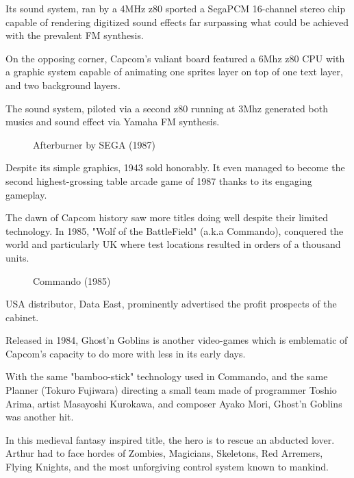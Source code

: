 Its sound system, ran by a 4MHz z80 sported a SegaPCM 16-channel stereo chip capable of rendering digitized sound effects far surpassing what could be achieved with the prevalent FM synthesis.

On the opposing corner, Capcom's valiant board featured a 6Mhz z80 CPU with a graphic system capable of animating one sprites layer on top of one text layer, and two background layers. 

The sound system, piloted via a second z80 running at 3Mhz generated both musics and sound effect via Yamaha FM synthesis.




\begin{figure}[H]
\caption*{Afterburner by SEGA (1987)}
\end{figure}

Despite its simple graphics, 1943 sold honorably. It even managed to become the second highest-grossing table arcade game of 1987 thanks to its engaging gameplay. 

The dawn of Capcom history saw more titles doing well despite their limited technology. In 1985, "Wolf of the BattleField" (a.k.a Commando), conquered the world and particularly UK where test locations resulted in orders of a thousand units\cite{cgm4}.

\begin{figure}[H]
\caption*{Commando (1985)}
\end{figure}

USA distributor, Data East, prominently advertised the profit prospects of the cabinet.
\vfill



Released in 1984, Ghost'n Goblins is another video-games which is emblematic of Capcom's capacity to do more with less in its early days. 

With the same "bamboo-stick" technology used in Commando, and the same Planner (Tokuro Fujiwara) directing a small team made of programmer Toshio Arima, artist Masayoshi Kurokawa, and composer Ayako Mori, Ghost'n Goblins was another hit.

In this medieval fantasy inspired title, the hero is to rescue an abducted lover. Arthur had to face hordes of Zombies, Magicians, Skeletons, Red Arremers, Flying Knights, and the most unforgiving control system known to mankind.

